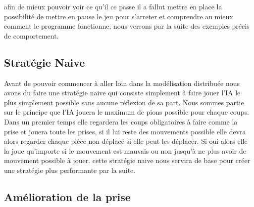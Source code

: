 \documentclass[11pt]{article} %
\begin{document}
afin de mieux pouvoir voir ce qu'il ce passe il a fallut mettre en place la possibilité de mettre en pause le jeu\cite{annexe2} pour s'arreter et comprendre au mieux comment le programme fonctionne, nous verrons par la suite des exemples précis de comportement. \\

\subsection{Stratégie Naive}
Avant de pouvoir commencer à aller loin dans la modélisation distribuée nous avons du faire une stratégie naive qui consiste simplement à faire jouer l'IA le plus simplement possible sans aucune réflexion de sa part. Nous sommes partie sur le principe que l'IA jouera le maximum de pions possible pour chaque coups. Dans un premier temps elle regardera les coups obligatoires à faire comme la prise et jouera toute les prises, si il lui reste des mouvements possible elle devra alors regarder chaque pièce non déplacé si elle peut les déplacer. Si oui alors elle la joue qu'importe si le mouvement est mauvais ou non jusqu'à ne plus avoir de mouvement possible à jouer. cette stratégie naive nous servira de base pour créer une stratégie plus performante par la suite.

\subsection{Amélioration de la prise}
\end{document}
